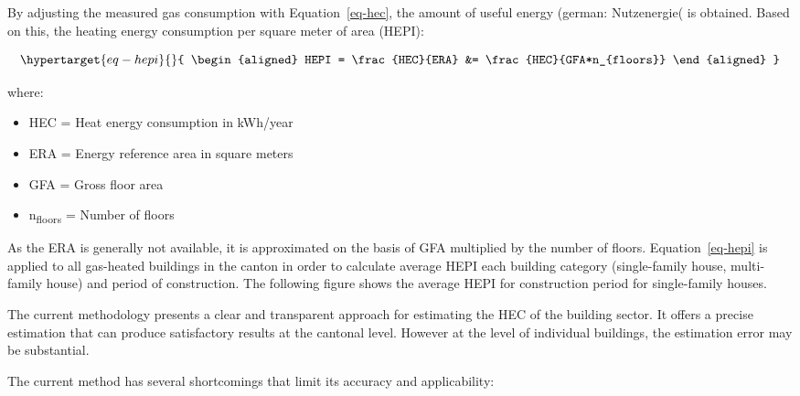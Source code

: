 \documentclass[
  letterpaper,
  DIV=11,
  numbers=noendperiod]{scrreprt}
\begin{document}
By adjusting the measured gas consumption with Equation~\ref{eq-hec},
the amount of useful energy (german: Nutzenergie( is obtained. Based on
this, the heating energy consumption per square meter of area (HEPI):

\begin{equation}\protect\hypertarget{eq-hepi}{}{
\begin{align}
HEPI = \frac{HEC}{ERA}
&= \frac{HEC}{GFA*n_{floors}}
\end{align}
}\label{eq-hepi}\end{equation}

where:

\begin{itemize}
\item
  HEC = Heat energy consumption in kWh/year
\item
  ERA = Energy reference area in square meters
\item
  GFA = Gross floor area
\item
  n\textsubscript{floors} = Number of floors
\end{itemize}

As the ERA is generally not available, it is approximated on the basis
of GFA multiplied by the number of floors. Equation~\ref{eq-hepi} is
applied to all gas-heated buildings in the canton in order to calculate
average HEPI each building category (single-family house, multi-family
house) and period of construction. The following figure shows the
average HEPI for construction period for single-family houses.

The current methodology presents a clear and transparent approach for
estimating the HEC of the building sector. It offers a precise
estimation that can produce satisfactory results at the cantonal level.
However at the level of individual buildings, the estimation error may
be substantial.

The current method has several shortcomings that limit its accuracy and
applicability:
\end{document}
